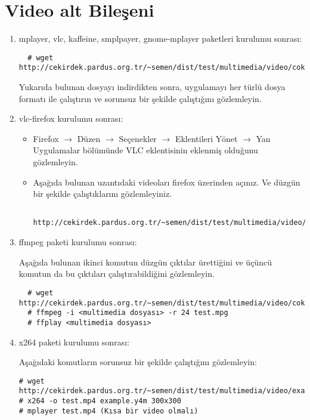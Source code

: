 \documentclass[a4paper,10pt]{article}
\begin{document}
\section{Video alt Bileşeni}
\begin{enumerate}
 \item mplayer, vlc, kaffeine, smplpayer, gnome-mplayer paketleri kurulumu sonrası:
 \begin{verbatim}
  # wget http://cekirdek.pardus.org.tr/~semen/dist/test/multimedia/video/cokluortam.tar
 \end{verbatim}
Yukarıda bulunan dosyayı indirdikten sonra, uygulamayı her türlü dosya formatı ile çalıştırın ve sorunsuz bir şekilde çalıştığını gözlemleyin.
 \item vlc-firefox kurulumu sonrası:
 \begin{itemize}
  \item Firefox $\rightarrow$ Düzen $\rightarrow$ Seçenekler $\rightarrow$ Eklentileri Yönet $\rightarrow$ Yan Uygulamalar bölümünde VLC eklentisinin eklenmiş olduğunu gözlemleyin.
  \item Aşağıda bulunan uzantıdaki videoları firefox üzerinden açınız. Ve düzgün bir şekilde çalıştıklarını gözlemleyiniz.
  \begin{verbatim}
  http://cekirdek.pardus.org.tr/~semen/dist/test/multimedia/video/cokluortam/  
  \end{verbatim}
 \end{itemize}
\item ffmpeg paketi kurulumu sonrası:
 
Aşağıda bulunan ikinci komutun düzgün çıktılar ürettiğini ve üçüncü komutun da bu çıktıları çalıştırabildiğini gözlemleyin.
\begin{verbatim}
  # wget http://cekirdek.pardus.org.tr/~semen/dist/test/multimedia/video/cokluortam.tar 
  # ffmpeg -i <multimedia dosyası> -r 24 test.mpg
  # ffplay <multimedia dosyası>
  \end{verbatim}
\item x264 paketi kurulumu sonrası:

Aşağıdaki komutların sorunsuz bir şekilde çalıştığını gözlemleyin:
\begin{verbatim}
# wget  http://cekirdek.pardus.org.tr/~semen/dist/test/multimedia/video/example.y4m
# x264 -o test.mp4 example.y4m 300x300 
# mplayer test.mp4 (Kısa bir video olmalı)
\end{verbatim}

\end{enumerate}
\end{document}
